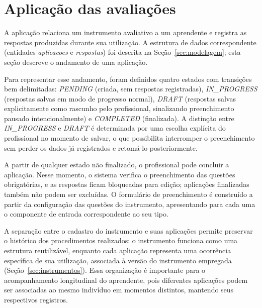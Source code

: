 \section{Aplicação das avaliações}\label{sec:aplicacoes}

A aplicação relaciona um instrumento avaliativo a um aprendente e registra as respostas produzidas durante sua utilização. A estrutura de dados correspondente (entidades \textit{aplicacoes} e \textit{respostas}) foi descrita na Seção~\ref{sec:modelagem}; esta seção descreve o andamento de uma aplicação.

Para representar esse andamento, foram definidos quatro estados com transições bem delimitadas: \textit{PENDING} (criada, sem respostas registradas), \textit{IN\_PROGRESS} (respostas salvas em modo de progresso normal), \textit{DRAFT} (respostas salvas explicitamente como rascunho pelo profissional, sinalizando preenchimento pausado intencionalmente) e \textit{COMPLETED} (finalizada). A distinção entre \textit{IN\_PROGRESS} e \textit{DRAFT} é determinada por uma escolha explícita do profissional no momento de salvar, o que possibilita interromper o preenchimento sem perder os dados já registrados e retomá-lo posteriormente.

A partir de qualquer estado não finalizado, o profissional pode concluir a aplicação. Nesse momento, o sistema verifica o preenchimento das questões obrigatórias, e as respostas ficam bloqueadas para edição; aplicações finalizadas também não podem ser excluídas. O formulário de preenchimento é construído a partir da configuração das questões do instrumento, apresentando para cada uma o componente de entrada correspondente ao seu tipo.

A separação entre o cadastro do instrumento e suas aplicações permite preservar o histórico dos procedimentos realizados: o instrumento funciona como uma estrutura reutilizável, enquanto cada aplicação representa uma ocorrência específica de sua utilização, associada à versão do instrumento empregada (Seção~\ref{sec:instrumentos}). Essa organização é importante para o acompanhamento longitudinal do aprendente, pois diferentes aplicações podem ser associadas ao mesmo indivíduo em momentos distintos, mantendo seus respectivos registros.
